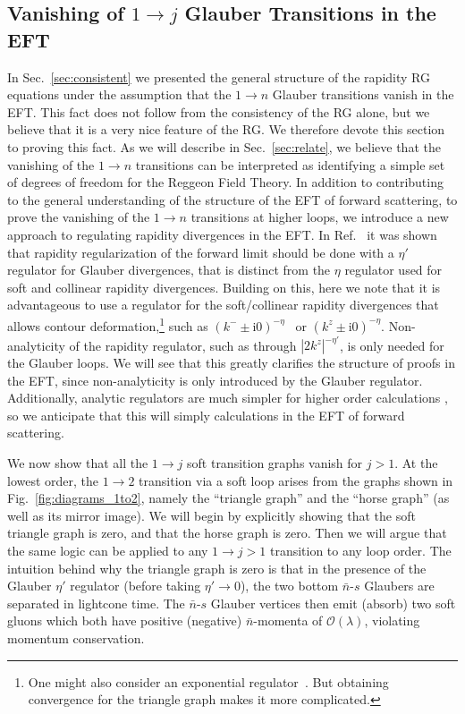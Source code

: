 \documentclass[letterpaper,11pt]{article}
\newcommand{\fig}[1]{Fig.~\ref{fig:#1}}
\newcommand{\img}{\mathrm{i}}
\newcommand{\cO}{\mathcal{O}}
\DeclareRobustCommand{\Sec}[1]{Sec.~\ref{#1}}
\newcommand{\bn}{{\bar n}}
\begin{document}
\subsection{Vanishing of  $1\to j$ Glauber Transitions in the EFT}
\label{sec:vanish}



In \Sec{sec:consistent} we presented the general structure of the rapidity RG equations under the assumption that the $1\to n$ Glauber transitions vanish in the EFT. This fact does not follow from the consistency of the RG alone, but we believe that it is a very nice feature of the RG. We therefore devote this section to proving this fact. As we will describe in \Sec{sec:relate}, we believe that the vanishing of the $1\to n$ transitions can be interpreted as
identifying a simple set of degrees of freedom for the Reggeon Field Theory.  In addition to contributing to the general understanding of the structure of the EFT of forward scattering, to prove the vanishing of the $1\to n$ transitions at higher loops, we introduce a new approach to regulating rapidity divergences in the EFT. In Ref.~\cite{Moult:2022lfy} it was shown that rapidity regularization of the forward limit should be done with a $\eta'$ regulator for Glauber divergences, that is distinct from the $\eta$ regulator used for soft and collinear rapidity divergences. Building on this, here we note that it is advantageous to use a regulator for the soft/collinear rapidity divergences that allows contour deformation,\footnote{One might also consider an exponential regulator~\cite{Li:2016axz}. But obtaining convergence for the triangle graph makes it more complicated.}
such as $(k^- \pm \img 0)^{-\eta}$~\cite{Becher:2011dz} or $(k^z \pm \img 0)^{-\eta}$.
Non-analyticity of the rapidity regulator, such as through $|2k^z|^{-\eta'}$, is only needed for the Glauber loops. We will see that this greatly clarifies the structure of proofs in the EFT, since non-analyticity is only introduced by the Glauber regulator. Additionally, analytic regulators are much simpler for higher order calculations \cite{Li:2016ctv,Moult:2022xzt,Duhr:2022yyp}, so we anticipate that this will simply calculations in the EFT of forward scattering. 

We now show that all the $1\to j$ soft transition graphs vanish for $j>1$.
At the lowest order, the $1\to2$ transition via a soft loop arises from the graphs shown in \fig{diagrams_1to2}, namely the ``triangle graph'' and the ``horse graph'' (as well as its mirror image).
We will begin by explicitly showing that the soft triangle graph is zero, and that the horse graph is zero.
Then we will argue that the same logic can be applied to any $1\to j>1$ transition to any loop order.  The intuition behind why the triangle graph is zero is that in the presence of the Glauber $\eta'$ regulator   (before taking $\eta'\to 0$), the two bottom $\bn$-$s$ Glaubers are separated in lightcone time. The $\bn$-$s$ Glauber vertices then emit (absorb) two soft gluons which both have positive (negative) $\bar n$-momenta of $\cO(\lambda)$, violating momentum conservation.
\end{document}
